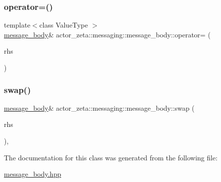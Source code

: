 \mbox{\label{classactor__zeta_1_1messaging_1_1message__body_a786d239d35a7a23e15fbff2663867e02}} 
\subsubsection{\texorpdfstring{operator=()}{operator=()}\hspace{0.1cm}{\footnotesize\ttfamily [3/3]}}
{\footnotesize\ttfamily template$<$class Value\+Type $>$ \\
\hyperlink{classactor__zeta_1_1messaging_1_1message__body}{message\+\_\+body}\& actor\+\_\+zeta\+::messaging\+::message\+\_\+body\+::operator= (\begin{DoxyParamCaption}\item[{Value\+Type \&\&}]{rhs }\end{DoxyParamCaption})\hspace{0.3cm}{\ttfamily [inline]}}

\mbox{\label{classactor__zeta_1_1messaging_1_1message__body_a0e9291345064f9cad985d4753e2c9de6}} 
\subsubsection{\texorpdfstring{swap()}{swap()}}
{\footnotesize\ttfamily \hyperlink{classactor__zeta_1_1messaging_1_1message__body}{message\+\_\+body}\& actor\+\_\+zeta\+::messaging\+::message\+\_\+body\+::swap (\begin{DoxyParamCaption}\item[{\hyperlink{classactor__zeta_1_1messaging_1_1message__body}{message\+\_\+body} \&}]{rhs }\end{DoxyParamCaption})\hspace{0.3cm}{\ttfamily [inline]}, {\ttfamily [noexcept]}}



The documentation for this class was generated from the following file\+:\begin{DoxyCompactItemize}
\item 
\hyperlink{message__body_8hpp}{message\+\_\+body.\+hpp}\end{DoxyCompactItemize}
